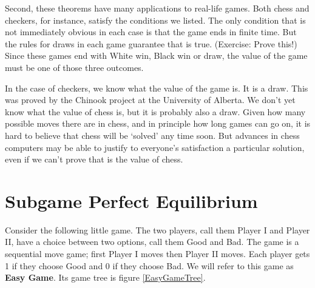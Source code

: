 \documentclass[openany]{book}
\begin{document}
Second, these theorems have many applications to real-life games. Both chess and checkers, for instance, satisfy the conditions we listed. The only condition that is not immediately obvious in each case is that the game ends in finite time. But the rules for draws in each game guarantee that is true. (Exercise: Prove this!) Since these games end with White win, Black win or draw, the value of the game must be one of those three outcomes.

In the case of checkers, we know what the value of the game is. It is a draw. This was proved by the Chinook project at the University of Alberta. We don't yet know what the value of chess is, but it is probably also a draw. Given how many possible moves there are in chess, and in principle how long games can go on, it is hard to believe that chess will be `solved' any time soon. But advances in chess computers may be able to justify to everyone's satisfaction a particular solution, even if we can't prove that is the value of chess.

\section{Subgame Perfect Equilibrium}

Consider the following little game. The two players, call them Player I and Player II, have a choice between two options, call them Good and Bad. The game is a sequential move game; first Player I moves then Player II moves. Each player gets 1 if they choose Good and 0 if they choose Bad. We will refer to this game as \textbf{Easy Game}. Its game tree is figure \ref{EasyGameTree}.
\end{document}
